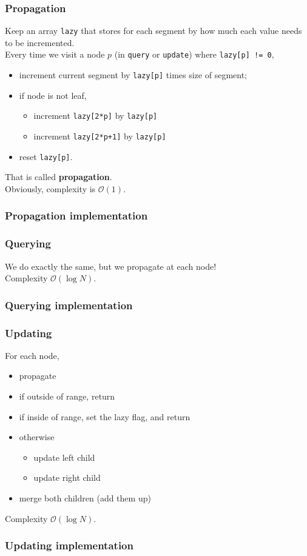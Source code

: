 \documentclass[12pt]{beamer}
\newcommand{\bigoh}{\mathcal{O}}
\begin{document}
\begin{frame}
    \frametitle{Propagation}
    Keep an array \lstinline{lazy} that stores for each segment by how much each value needs to be incremented. \\
    Every time we visit a node $p$ (in \lstinline{query} or \lstinline{update}) where \lstinline{lazy[p] != 0},
    \begin{itemize}
        \item increment current segment by \lstinline{lazy[p]} times size of segment;
        \item if node is not leaf,
            \begin{itemize}
                \item increment \lstinline{lazy[2*p]} by \lstinline{lazy[p]}
                \item increment \lstinline{lazy[2*p+1]} by \lstinline{lazy[p]}
            \end{itemize}
        \item reset \lstinline{lazy[p]}.
    \end{itemize}
    That is called \textbf{propagation}. \\
    Obviously, complexity is $\bigoh(1)$.
\end{frame}

\begin{frame}
    \frametitle{Propagation implementation}
    
\end{frame}

\begin{frame}
    \frametitle{Querying}
    We do exactly the same, but we propagate at each node! \\
    Complexity $\bigoh(\log N)$.

\end{frame}

\begin{frame}
    \frametitle{Querying implementation}
    
\end{frame}

\begin{frame}
    \frametitle{Updating}
    For each node, 
    \begin{itemize}
        \item propagate
        \item if outside of range, return
        \item if inside of range, set the lazy flag, and return
        \item otherwise
            \begin{itemize}
                \item update left child
                \item update right child
            \end{itemize}
        \item merge both children (add them up)
    \end{itemize}
    Complexity $\bigoh(\log N)$.
\end{frame}

\begin{frame}
    \frametitle{Updating implementation}
    
\end{frame}
\end{document}
